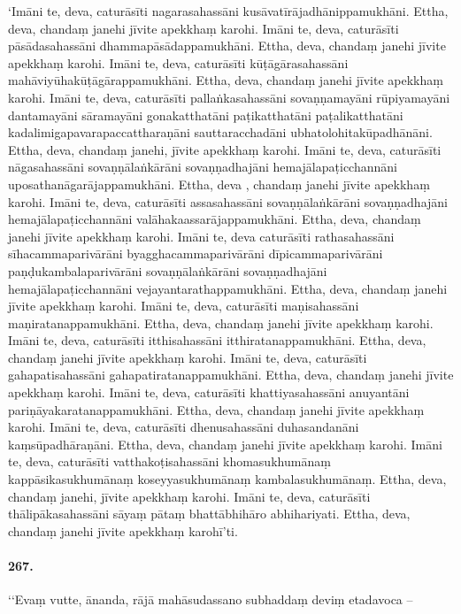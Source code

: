 ‘Imāni te, deva, caturāsīti nagarasahassāni kusāvatīrājadhānippamukhāni. Ettha, deva, chandaṃ janehi jīvite apekkhaṃ karohi. Imāni te, deva, caturāsīti pāsādasahassāni dhammapāsādappamukhāni. Ettha, deva, chandaṃ janehi jīvite apekkhaṃ karohi. Imāni te, deva, caturāsīti kūṭāgārasahassāni mahāviyūhakūṭāgārappamukhāni. Ettha, deva, chandaṃ janehi jīvite apekkhaṃ karohi. Imāni te, deva, caturāsīti pallaṅkasahassāni sovaṇṇamayāni rūpiyamayāni dantamayāni sāramayāni gonakatthatāni paṭikatthatāni paṭalikatthatāni kadalimigapavarapaccattharaṇāni sauttaracchadāni ubhatolohitakūpadhānāni. Ettha, deva, chandaṃ janehi, jīvite apekkhaṃ karohi. Imāni te, deva, caturāsīti nāgasahassāni sovaṇṇālaṅkārāni sovaṇṇadhajāni hemajālapaṭicchannāni uposathanāgarājappamukhāni. Ettha, deva , chandaṃ janehi jīvite apekkhaṃ karohi. Imāni te, deva, caturāsīti assasahassāni sovaṇṇālaṅkārāni sovaṇṇadhajāni hemajālapaṭicchannāni valāhakaassarājappamukhāni. Ettha, deva, chandaṃ janehi jīvite apekkhaṃ karohi. Imāni te, deva caturāsīti rathasahassāni sīhacammaparivārāni byagghacammaparivārāni dīpicammaparivārāni paṇḍukambalaparivārāni sovaṇṇālaṅkārāni sovaṇṇadhajāni hemajālapaṭicchannāni vejayantarathappamukhāni. Ettha, deva, chandaṃ janehi jīvite apekkhaṃ karohi. Imāni te, deva, caturāsīti maṇisahassāni maṇiratanappamukhāni. Ettha, deva, chandaṃ janehi jīvite apekkhaṃ karohi. Imāni te, deva, caturāsīti itthisahassāni itthiratanappamukhāni. Ettha, deva, chandaṃ janehi jīvite apekkhaṃ karohi. Imāni te, deva, caturāsīti gahapatisahassāni gahapatiratanappamukhāni. Ettha, deva, chandaṃ janehi jīvite apekkhaṃ karohi. Imāni te, deva, caturāsīti khattiyasahassāni anuyantāni pariṇāyakaratanappamukhāni. Ettha, deva, chandaṃ janehi jīvite apekkhaṃ karohi. Imāni te, deva, caturāsīti dhenusahassāni duhasandanāni kaṃsūpadhāraṇāni. Ettha, deva, chandaṃ janehi jīvite apekkhaṃ karohi. Imāni te, deva, caturāsīti vatthakoṭisahassāni khomasukhumānaṃ kappāsikasukhumānaṃ koseyyasukhumānaṃ kambalasukhumānaṃ. Ettha, deva, chandaṃ janehi, jīvite apekkhaṃ karohi. Imāni te, deva, caturāsīti thālipākasahassāni sāyaṃ pātaṃ bhattābhihāro abhihariyati. Ettha, deva, chandaṃ janehi jīvite apekkhaṃ karohī’ti.

\paragraph{267.} ‘‘Evaṃ vutte, ānanda, rājā mahāsudassano subhaddaṃ deviṃ etadavoca –

